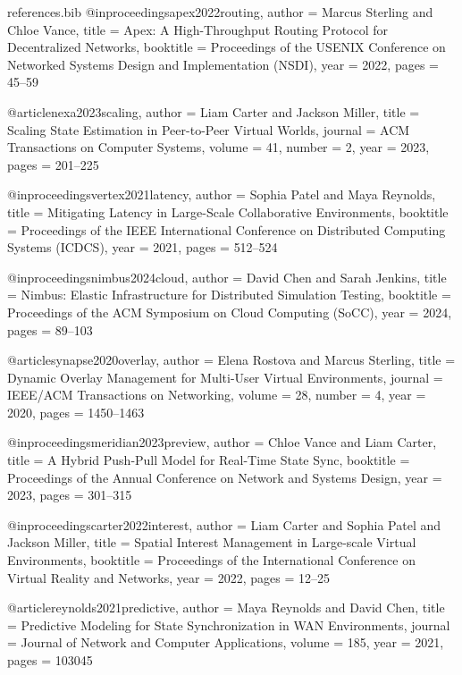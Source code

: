 \documentclass[10pt,twocolumn]{article}
\begin{document}
\begin{filecontents*}{references.bib}
@inproceedings{apex2022routing,
  author    = {Marcus Sterling and Chloe Vance},
  title     = {Apex: A High-Throughput Routing Protocol for Decentralized Networks},
  booktitle = {Proceedings of the USENIX Conference on Networked Systems Design and Implementation (NSDI)},
  year      = {2022},
  pages     = {45--59}
}

@article{nexa2023scaling,
  author    = {Liam Carter and Jackson Miller},
  title     = {Scaling State Estimation in Peer-to-Peer Virtual Worlds},
  journal   = {ACM Transactions on Computer Systems},
  volume    = {41},
  number    = {2},
  year      = {2023},
  pages     = {201--225}
}

@inproceedings{vertex2021latency,
  author    = {Sophia Patel and Maya Reynolds},
  title     = {Mitigating Latency in Large-Scale Collaborative Environments},
  booktitle = {Proceedings of the IEEE International Conference on Distributed Computing Systems (ICDCS)},
  year      = {2021},
  pages     = {512--524}
}

@inproceedings{nimbus2024cloud,
  author    = {David Chen and Sarah Jenkins},
  title     = {Nimbus: Elastic Infrastructure for Distributed Simulation Testing},
  booktitle = {Proceedings of the ACM Symposium on Cloud Computing (SoCC)},
  year      = {2024},
  pages     = {89--103}
}

@article{synapse2020overlay,
  author    = {Elena Rostova and Marcus Sterling},
  title     = {Dynamic Overlay Management for Multi-User Virtual Environments},
  journal   = {IEEE/ACM Transactions on Networking},
  volume    = {28},
  number    = {4},
  year      = {2020},
  pages     = {1450--1463}
}

@inproceedings{meridian2023preview,
  author    = {Chloe Vance and Liam Carter},
  title     = {A Hybrid Push-Pull Model for Real-Time State Sync},
  booktitle = {Proceedings of the Annual Conference on Network and Systems Design},
  year      = {2023},
  pages     = {301--315}
}

@inproceedings{carter2022interest,
  author    = {Liam Carter and Sophia Patel and Jackson Miller},
  title     = {Spatial Interest Management in Large-scale Virtual Environments},
  booktitle = {Proceedings of the International Conference on Virtual Reality and Networks},
  year      = {2022},
  pages     = {12--25}
}

@article{reynolds2021predictive,
  author    = {Maya Reynolds and David Chen},
  title     = {Predictive Modeling for State Synchronization in WAN Environments},
  journal   = {Journal of Network and Computer Applications},
  volume    = {185},
  year      = {2021},
  pages     = {103045}
}


\end{filecontents*}
\end{document}
